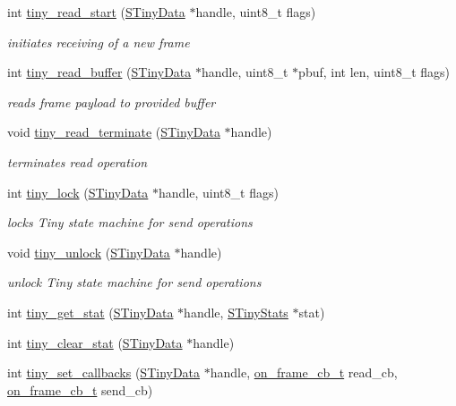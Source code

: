 \begin{DoxyCompactItemize}
int \hyperlink{group__ADVANCED__API_ga2f0547115de5b96a828d79f5491d22fa}{tiny\+\_\+read\+\_\+start} (\hyperlink{structSTinyData}{S\+Tiny\+Data} $\ast$handle, uint8\+\_\+t flags)
\begin{DoxyCompactList}\small\item\em initiates receiving of a new frame \end{DoxyCompactList}\item 
int \hyperlink{group__ADVANCED__API_gade4e07eb12b8e32e6dd0c7b9757e8f39}{tiny\+\_\+read\+\_\+buffer} (\hyperlink{structSTinyData}{S\+Tiny\+Data} $\ast$handle, uint8\+\_\+t $\ast$pbuf, int len, uint8\+\_\+t flags)
\begin{DoxyCompactList}\small\item\em reads frame payload to provided buffer \end{DoxyCompactList}\item 
void \hyperlink{group__ADVANCED__API_gaab48caab81a46d74fb52f2afb2649b61}{tiny\+\_\+read\+\_\+terminate} (\hyperlink{structSTinyData}{S\+Tiny\+Data} $\ast$handle)
\begin{DoxyCompactList}\small\item\em terminates read operation \end{DoxyCompactList}\item 
int \hyperlink{group__ADVANCED__API_gac318682c20279f9f20ffc6f636a7f1c9}{tiny\+\_\+lock} (\hyperlink{structSTinyData}{S\+Tiny\+Data} $\ast$handle, uint8\+\_\+t flags)
\begin{DoxyCompactList}\small\item\em locks Tiny state machine for send operations \end{DoxyCompactList}\item 
void \hyperlink{group__ADVANCED__API_gae4bfad55a4ef5814a5af50f044f6d7cd}{tiny\+\_\+unlock} (\hyperlink{structSTinyData}{S\+Tiny\+Data} $\ast$handle)
\begin{DoxyCompactList}\small\item\em unlock Tiny state machine for send operations \end{DoxyCompactList}\item 
int \hyperlink{group__ADVANCED__API_ga5f61774b2027a91f772f31d943acdd3f}{tiny\+\_\+get\+\_\+stat} (\hyperlink{structSTinyData}{S\+Tiny\+Data} $\ast$handle, \hyperlink{structSTinyStats}{S\+Tiny\+Stats} $\ast$stat)
\item 
int \hyperlink{group__ADVANCED__API_gac75ee03ea3691b0a8bf842d764b342d9}{tiny\+\_\+clear\+\_\+stat} (\hyperlink{structSTinyData}{S\+Tiny\+Data} $\ast$handle)
\item 
int \hyperlink{group__ADVANCED__API_gac562103dd1699b82fddf29dccdc0ec7c}{tiny\+\_\+set\+\_\+callbacks} (\hyperlink{structSTinyData}{S\+Tiny\+Data} $\ast$handle, \hyperlink{tiny__layer2_8h_acf94db3677aab46f4a42978d53cc23e3}{on\+\_\+frame\+\_\+cb\+\_\+t} read\+\_\+cb, \hyperlink{tiny__layer2_8h_acf94db3677aab46f4a42978d53cc23e3}{on\+\_\+frame\+\_\+cb\+\_\+t} send\+\_\+cb)
\end{DoxyCompactItemize}


